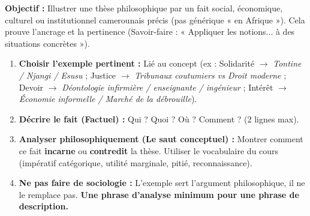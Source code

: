 \documentclass[11pt]{article}
\newcommand{\cle}[1]{{\popxbold\color{popdark}#1}}
\begin{document}
\begin{methode}
\textbf{Objectif :} Illustrer une thèse philosophique par un fait social, économique, culturel ou institutionnel camerounais précis (pas générique « en Afrique »). Cela prouve l'\cle{ancrage} et la \cle{pertinence} (Savoir-faire : « Appliquer les notions... à des situations concrètes »).
\begin{enumerate}
    \item \textbf{Choisir l'exemple pertinent :} Lié au concept (ex : \cle{Solidarité} $\rightarrow$ \emph{Tontine / Njangi / Esusu} ; \cle{Justice} $\rightarrow$ \emph{Tribunaux coutumiers vs Droit moderne} ; \cle{Devoir} $\rightarrow$ \emph{Déontologie infirmière / enseignante / ingénieur} ; \cle{Intérêt} $\rightarrow$ \emph{Économie informelle / Marché de la débrouille}).
    \item \textbf{Décrire le fait (Factuel) :} Qui ? Quoi ? Où ? Comment ? (2 lignes max).
    \item \textbf{Analyser philosophiquement (Le saut conceptuel) :} Montrer comment ce fait \textbf{incarne} ou \textbf{contredit} la thèse. Utiliser le vocabulaire du cours (\cle{impératif catégorique}, \cle{utilité marginale}, \cle{pitié}, \cle{reconnaissance}).
    \item \textbf{Ne pas faire de sociologie :} L'exemple sert l'argument philosophique, il ne le remplace pas. \textbf{Une phrase d'analyse minimum pour une phrase de description.}
\end{enumerate}
\end{methode}
\end{document}
